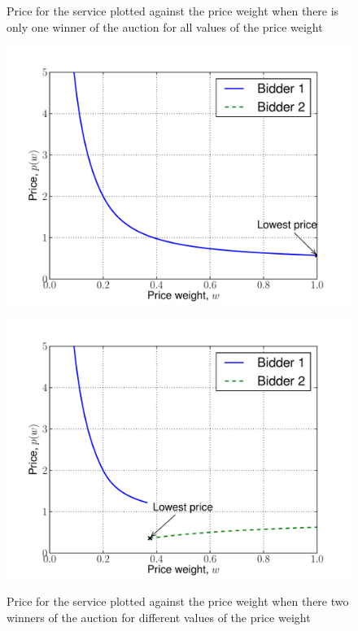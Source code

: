 \begin{figure}[tp!]
  \caption{Price for the service plotted against the price weight when there is only one winner of the auction for all values of the price weight}
  \includegraphics[width=\figsize]{2/Figures/indirect_win_prices_15_25_25_75}
  \label{fig:indirect_win_prices_15_25_25_75}
  \caption{Price for the service plotted against the price weight when there two winners of the auction for different values of the price weight}
  \includegraphics[width=\figsize]{2/Figures/indirect_win_prices_75_25_25_75}
  \label{fig:indirect_win_prices_75_25_25_75}
\end{figure}
